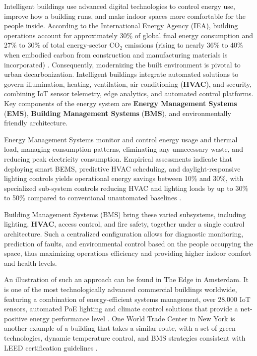 \documentclass[pdflatex,sn-mathphys-num]{sn-jnl}%
\theoremstyle{thmstyleone}%
\theoremstyle{thmstyletwo}%
\theoremstyle{thmstylethree}%
\begin{document}
Intelligent buildings use advanced digital technologies to control energy use, improve how a building runs, and make indoor spaces more comfortable for the people inside. According to the International Energy Agency (IEA), building operations account for approximately 30\% of global final energy consumption and 27\% to 30\% of total energy-sector $\text{CO}_2$ emissions (rising to nearly 36\% to 40\% when embodied carbon from construction and manufacturing materials is incorporated) \cite{r125}. Consequently, modernizing the built environment is pivotal to urban decarbonization. Intelligent buildings integrate automated solutions to govern illumination, heating, ventilation, air conditioning (\textbf{HVAC}), and security, combining IoT sensor telemetry, edge analytics, and automated control platforms. Key components of the energy system are \textbf{Energy Management Systems} (\textbf{EMS}), \textbf{Building Management Systems} (\textbf{BMS}), and environmentally friendly architecture.

Energy Management Systems monitor and control energy usage and thermal load, managing consumption patterns, eliminating any unnecessary waste, and reducing peak electricity consumption. Empirical assessments indicate that deploying smart BEMS, predictive HVAC scheduling, and daylight-responsive lighting controls yields operational energy savings between 10\% and 30\%, with specialized sub-system controls reducing HVAC and lighting loads by up to 30\% to 50\% compared to conventional unautomated baselines \cite{r19,r125}.

Building Management Systems (BMS) bring these varied subsystems, including lighting, \textbf{HVAC}, access control, and fire safety, together under a single control architecture. Such a centralized configuration allows for diagnostic monitoring, prediction of faults, and environmental control based on the people occupying the space, thus maximizing operations efficiency and providing higher indoor comfort and health levels.

An illustration of such an approach can be found in The Edge in Amsterdam. It is one of the most technologically advanced commercial buildings worldwide, featuring a combination of energy-efficient systems management, over 28,000 IoT sensors, automated PoE lighting and climate control solutions that provide a net-positive energy performance level \cite{r46}. One World Trade Center in New York is another example of a building that takes a similar route, with a set of green technologies, dynamic temperature control, and BMS strategies consistent with LEED certification guidelines \cite{r47}.
\end{document}
